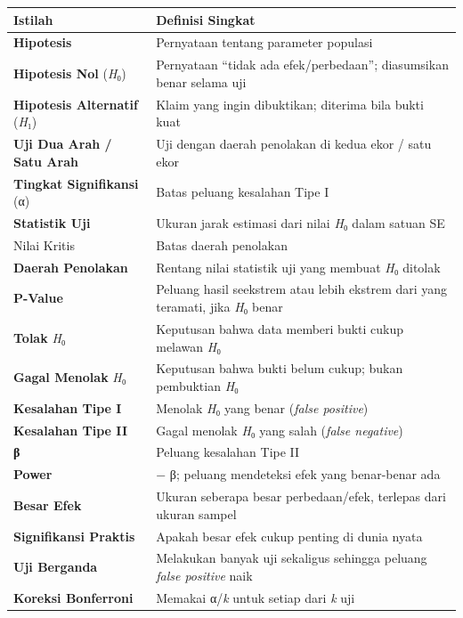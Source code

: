 \documentclass[
  indonesian,
  letterpaper,
]{book}
\newcounter{none} %
\begin{document}
{\def\LTcaptype{none} %
\begin{longtable}[]{@{}
  >{\raggedright\arraybackslash}p{}
  >{\raggedright\arraybackslash}p{}@{}}
\toprule\noalign{}
\begin{minipage}[b]{\linewidth}\raggedright
Istilah
\end{minipage} & \begin{minipage}[b]{\linewidth}\raggedright
Definisi Singkat
\end{minipage} \\
\midrule\noalign{}
\endhead
\bottomrule\noalign{}
\endlastfoot
\textbf{Hipotesis} & Pernyataan tentang parameter populasi \\
\textbf{Hipotesis Nol} (\emph{H}₀) & Pernyataan ``tidak ada
efek/perbedaan''; diasumsikan benar selama uji \\
\textbf{Hipotesis Alternatif} (\emph{H}₁) & Klaim yang ingin dibuktikan;
diterima bila bukti kuat \\
\textbf{Uji Dua Arah / Satu Arah} & Uji dengan daerah penolakan di kedua
ekor / satu ekor \\
\textbf{Tingkat Signifikansi} (α) & Batas peluang kesalahan Tipe I \\
\textbf{Statistik Uji} & Ukuran jarak estimasi dari nilai \emph{H}₀
dalam satuan SE \\
Nilai Kritis & Batas daerah penolakan \\
\textbf{Daerah Penolakan} & Rentang nilai statistik uji yang membuat
\emph{H}₀ ditolak \\
\textbf{P-Value} & Peluang hasil seekstrem atau lebih ekstrem dari yang
teramati, jika \emph{H}₀ benar \\
\textbf{Tolak} \emph{H}₀ & Keputusan bahwa data memberi bukti cukup
melawan \emph{H}₀ \\
\textbf{Gagal Menolak} \emph{H}₀ & Keputusan bahwa bukti belum cukup;
bukan pembuktian \emph{H}₀ \\
\textbf{Kesalahan Tipe I} & Menolak \emph{H}₀ yang benar (\emph{false
positive}) \\
\textbf{Kesalahan Tipe II} & Gagal menolak \emph{H}₀ yang salah
(\emph{false negative}) \\
\textbf{β} & Peluang kesalahan Tipe II \\
\textbf{Power} & 1 − β; peluang mendeteksi efek yang benar-benar ada \\
\textbf{Besar Efek} & Ukuran seberapa besar perbedaan/efek, terlepas
dari ukuran sampel \\
\textbf{Signifikansi Praktis} & Apakah besar efek cukup penting di dunia
nyata \\
\textbf{Uji Berganda} & Melakukan banyak uji sekaligus sehingga peluang
\emph{false positive} naik \\
\textbf{Koreksi Bonferroni} & Memakai α/\emph{k} untuk setiap dari
\emph{k} uji \\
\end{longtable}
}
\end{document}
